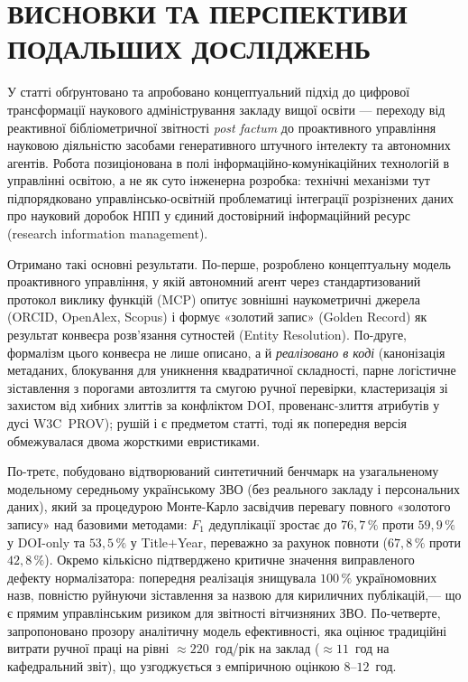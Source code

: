 \section*{ВИСНОВКИ ТА ПЕРСПЕКТИВИ ПОДАЛЬШИХ ДОСЛІДЖЕНЬ}

У статті обґрунтовано та апробовано концептуальний підхід до цифрової трансформації наукового адміністрування закладу вищої освіти --- переходу від реактивної бібліометричної звітності \emph{post factum} до проактивного управління науковою діяльністю засобами генеративного штучного інтелекту та автономних агентів. Робота позиціонована в полі інформаційно-комунікаційних технологій в управлінні освітою, а не як суто інженерна розробка: технічні механізми тут підпорядковано управлінсько-освітній проблематиці інтеграції розрізнених даних про науковий доробок НПП у єдиний достовірний інформаційний ресурс (research information management).

Отримано такі основні результати. По-перше, розроблено концептуальну модель проактивного управління, у якій автономний агент через стандартизований протокол виклику функцій (MCP) опитує зовнішні наукометричні джерела (ORCID, OpenAlex, Scopus) і формує «золотий запис» (Golden Record) як результат конвеєра розв'язання сутностей (Entity Resolution). По-друге, формалізм цього конвеєра не лише описано, а й \emph{реалізовано в коді} (канонізація метаданих, блокування для уникнення квадратичної складності, парне логістичне зіставлення з порогами автозлиття та смугою ручної перевірки, кластеризація зі захистом від хибних злиттів за конфліктом DOI, провенанс-злиття атрибутів у дусі W3C~PROV); рушій і є предметом статті, тоді як попередня версія обмежувалася двома жорсткими евристиками.

По-третє, побудовано відтворюваний синтетичний бенчмарк на узагальненому модельному середньому українському ЗВО (без реального закладу і персональних даних), який за процедурою Монте-Карло засвідчив перевагу повного «золотого запису» над базовими методами: $F_1$ дедуплікації зростає до $76{,}7\,\%$ проти $59{,}9\,\%$ у DOI-only та $53{,}5\,\%$ у Title$+$Year, переважно за рахунок повноти ($67{,}8\,\%$ проти $42{,}8\,\%$). Окремо кількісно підтверджено критичне значення виправленого дефекту нормалізатора: попередня реалізація знищувала $100\,\%$ україномовних назв, повністю руйнуючи зіставлення за назвою для кириличних публікацій,--- що є прямим управлінським ризиком для звітності вітчизняних ЗВО. По-четверте, запропоновано прозору аналітичну модель ефективності, яка оцінює традиційні витрати ручної праці на рівні $\approx 220$~год/рік на заклад ($\approx 11$~год на кафедральний звіт), що узгоджується з емпіричною оцінкою $8$--$12$~год.


